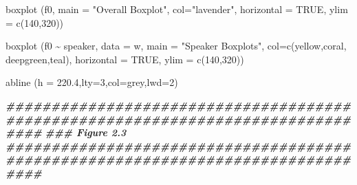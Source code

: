 \documentclass[
]{book}
\newenvironment{Shaded}{\begin{snugshade}}{\end{snugshade}}
\newcommand{\AttributeTok}[1]{\textcolor[rgb]{0.77,0.63,0.00}{#1}}
\newcommand{\ConstantTok}[1]{\textcolor[rgb]{0.00,0.00,0.00}{#1}}
\newcommand{\DecValTok}[1]{\textcolor[rgb]{0.00,0.00,0.81}{#1}}
\newcommand{\DocumentationTok}[1]{\textcolor[rgb]{0.56,0.35,0.01}{\textbf{\textit{#1}}}}
\newcommand{\FloatTok}[1]{\textcolor[rgb]{0.00,0.00,0.81}{#1}}
\newcommand{\FunctionTok}[1]{\textcolor[rgb]{0.00,0.00,0.00}{#1}}
\newcommand{\NormalTok}[1]{#1}
\newcommand{\SpecialCharTok}[1]{\textcolor[rgb]{0.00,0.00,0.00}{#1}}
\newcommand{\StringTok}[1]{\textcolor[rgb]{0.31,0.60,0.02}{#1}}
\begin{document}
\begin{Shaded}
\begin{Highlighting}[]
\FunctionTok{boxplot}\NormalTok{ (f0, }\AttributeTok{main =} \StringTok{"Overall Boxplot"}\NormalTok{, }\AttributeTok{col=}\StringTok{"lavender"}\NormalTok{, }
         \AttributeTok{horizontal =} \ConstantTok{TRUE}\NormalTok{, }\AttributeTok{ylim =} \FunctionTok{c}\NormalTok{(}\DecValTok{140}\NormalTok{,}\DecValTok{320}\NormalTok{)) }

\FunctionTok{boxplot}\NormalTok{ (f0 }\SpecialCharTok{\textasciitilde{}}\NormalTok{ speaker, }\AttributeTok{data =}\NormalTok{ w, }\AttributeTok{main =} \StringTok{"Speaker Boxplots"}\NormalTok{, }\AttributeTok{col=}\FunctionTok{c}\NormalTok{(yellow,coral,}
\NormalTok{         deepgreen,teal), }\AttributeTok{horizontal =} \ConstantTok{TRUE}\NormalTok{, }\AttributeTok{ylim =} \FunctionTok{c}\NormalTok{(}\DecValTok{140}\NormalTok{,}\DecValTok{320}\NormalTok{)) }

\FunctionTok{abline}\NormalTok{ (}\AttributeTok{h =} \FloatTok{220.4}\NormalTok{,}\AttributeTok{lty=}\DecValTok{3}\NormalTok{,}\AttributeTok{col=}\StringTok{\textquotesingle{}grey\textquotesingle{}}\NormalTok{,}\AttributeTok{lwd=}\DecValTok{2}\NormalTok{)}

\DocumentationTok{\#\#\#\#\#\#\#\#\#\#\#\#\#\#\#\#\#\#\#\#\#\#\#\#\#\#\#\#\#\#\#\#\#\#\#\#\#\#\#\#\#\#\#\#\#\#\#\#\#\#\#\#\#\#\#\#\#\#\#\#\#\#\#\#\#\#\#\#\#\#\#\#\#\#\#\#\#\#\#\#}
\DocumentationTok{\#\#\# Figure 2.3}
\DocumentationTok{\#\#\#\#\#\#\#\#\#\#\#\#\#\#\#\#\#\#\#\#\#\#\#\#\#\#\#\#\#\#\#\#\#\#\#\#\#\#\#\#\#\#\#\#\#\#\#\#\#\#\#\#\#\#\#\#\#\#\#\#\#\#\#\#\#\#\#\#\#\#\#\#\#\#\#\#\#\#\#\#}


\end{Highlighting}
\end{Shaded}
\end{document}
